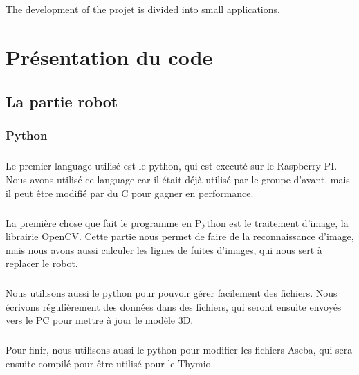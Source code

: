 \documentclass[12pt]{report}
\begin{document}
\paragraph{}
The development of the projet is divided into small applications. 







\chapter{Présentation du code}
\section{La partie robot}
\subsection{Python}
\paragraph{}
Le premier language utilisé est le python, qui est executé sur le Raspberry PI. Nous avons utilisé ce language car il était déjà utilisé par le groupe d'avant, mais il peut être modifié par du C pour gagner en performance.

\paragraph{}
La première chose que fait le programme en Python est le traitement d'image, la librairie OpenCV. Cette partie nous permet de faire de la reconnaissance d'image, mais nous avons aussi calculer les lignes de fuites d'images, qui nous sert à replacer le robot.

\paragraph{}
Nous utilisons aussi le python pour pouvoir gérer facilement des fichiers. Nous écrivons régulièrement des données dans des fichiers, qui seront ensuite envoyés vers le PC pour mettre à jour le modèle 3D.

\paragraph{}
Pour finir, nous utilisons aussi le python pour modifier les fichiers Aseba, qui sera ensuite compilé pour être utilisé pour le Thymio.
\end{document}
